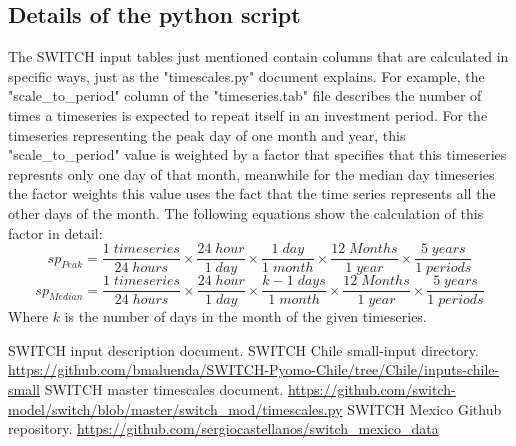 \documentclass{article}
\begin{document}
\subsection{Details of the python script}
The SWITCH input tables just mentioned contain columns that are calculated in specific ways, just as the "timescales.py" document explains\cite{master}. For example, the "scale\_to\_period" column of the "timeseries.tab" file describes the number of times a timeseries is expected to repeat itself in an investment period. For the timeseries representing the peak day of one month and year, this "scale\_to\_period" value is weighted by a factor that specifies that this timeseries represnts only one day of that month, meanwhile for the median day timeseries the factor weights this value uses the fact that the time series represents all the other days of the month. The following equations show the calculation of this factor in detail:
\begin{equation}
sp_{Peak}= \frac{1 \; timeseries}{24 \; hours} \times \frac{24 \; hour}{1 \; day} \times \frac{1 \; day}{1 \; month} \times \frac{12 \; Months}{1 \; year} \times \frac{5 \; years}{1 \; periods}
\end{equation}
\begin{equation}
sp_{Median}= \frac{1 \; timeseries}{24 \; hours} \times \frac{24 \; hour}{1 \; day} \times \frac{k-1 \; days}{1 \; month} \times \frac{12 \; Months}{1 \; year} \times \frac{5 \; years}{1 \; periods}
\end{equation}
Where $k$ is the number of days in the month of the given timeseries.
\begin{thebibliography}{9}
 SWITCH input description document.
 SWITCH Chile small-input directory. \url{https://github.com/bmaluenda/SWITCH-Pyomo-Chile/tree/Chile/inputs-chile-small}
 SWITCH master timescales document. \url{https://github.com/switch-model/switch/blob/master/switch_mod/timescales.py}
 SWITCH Mexico Github repository. \url{https://github.com/sergiocastellanos/switch_mexico_data}
\end{thebibliography}
\end{document}
